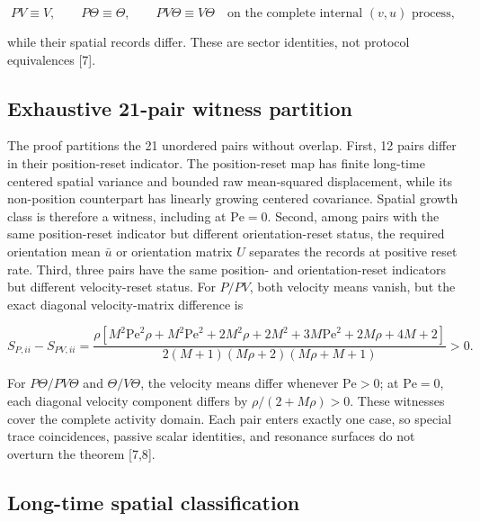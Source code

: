 \[
PV\equiv V,\qquad P\Theta\equiv\Theta,\qquad PV\Theta\equiv V\Theta
\quad\text{on the complete internal }(v,u)\text{ process},
\]

while their spatial records differ. These are sector identities, not protocol equivalences {[}7{]}.

\subsection{Exhaustive 21-pair witness partition}\label{exhaustive-21-pair-witness-partition}

The proof partitions the 21 unordered pairs without overlap. First, 12 pairs differ in their position-reset indicator. The position-reset map has finite long-time centered spatial variance and bounded raw mean-squared displacement, while its non-position counterpart has linearly growing centered covariance. Spatial growth class is therefore a witness, including at \(\mathrm{Pe}=0\). Second, among pairs with the same position-reset indicator but different orientation-reset status, the required orientation mean \(\bar u\) or orientation matrix \(U\) separates the records at positive reset rate. Third, three pairs have the same position- and orientation-reset indicators but different velocity-reset status. For \(P/PV\), both velocity means vanish, but the exact diagonal velocity-matrix difference is

\[
S_{P,ii}-S_{PV,ii}=
\frac{\rho\left[
M^2\mathrm{Pe}^2\rho+M^2\mathrm{Pe}^2+2M^2\rho+2M^2+
3M\mathrm{Pe}^2+2M\rho+4M+2\right]}
{2(M+1)(M\rho+2)(M\rho+M+1)}>0 .
\]

For \(P\Theta/PV\Theta\) and \(\Theta/V\Theta\), the velocity means differ whenever \(\mathrm{Pe}>0\); at \(\mathrm{Pe}=0\), each diagonal velocity component differs by \(\rho/(2+M\rho)>0\). These witnesses cover the complete activity domain. Each pair enters exactly one case, so special trace coincidences, passive scalar identities, and resonance surfaces do not overturn the theorem {[}7,8{]}.

\subsection{Long-time spatial classification}\label{long-time-spatial-classification}

